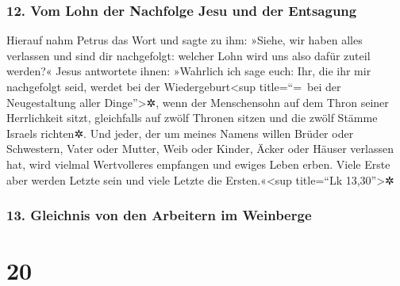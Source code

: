 \hypertarget{vom-lohn-der-nachfolge-jesu-und-der-entsagung}{%
\subsubsection{12. Vom Lohn der Nachfolge Jesu und der
Entsagung}\label{vom-lohn-der-nachfolge-jesu-und-der-entsagung}}

 Hierauf nahm Petrus das Wort und sagte zu ihm: »Siehe,
wir haben alles verlassen und sind dir nachgefolgt: welcher Lohn wird
uns also dafür zuteil werden?«  Jesus antwortete ihnen:
»Wahrlich ich sage euch: Ihr, die ihr mir nachgefolgt seid, werdet bei
der Wiedergeburt\textless sup title=``=~bei der Neugestaltung aller
Dinge''\textgreater✲, wenn der Menschensohn auf dem Thron seiner
Herrlichkeit sitzt, gleichfalls auf zwölf Thronen sitzen und die zwölf
Stämme Israels richten✲.  Und jeder, der um meines Namens
willen Brüder oder Schwestern, Vater oder Mutter, Weib oder Kinder,
Äcker oder Häuser verlassen hat, wird vielmal Wertvolleres empfangen und
ewiges Leben erben.  Viele Erste aber werden Letzte sein
und viele Letzte die Ersten.«\textless sup title=``Lk
13,30''\textgreater✲

\hypertarget{gleichnis-von-den-arbeitern-im-weinberge}{%
\subsubsection{13. Gleichnis von den Arbeitern im
Weinberge}\label{gleichnis-von-den-arbeitern-im-weinberge}}

\hypertarget{section-19}{%
\section{20}\label{section-19}}

